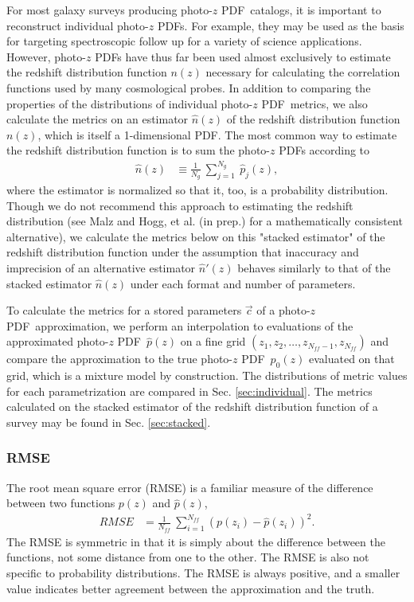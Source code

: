 \documentclass[\docopts]{\docclass}
\newcommand{\pz}{photo-$z$ PDF}
\begin{document}
For most galaxy surveys producing \pz\ catalogs, it is important to reconstruct 
individual \pz s.  For example, they may be used as the basis for targeting 
spectroscopic follow up for a variety of science applications.  However, \pz s 
have thus far been used almost exclusively to estimate the redshift 
distribution function $n(z)$ necessary for calculating the correlation 
functions used by many cosmological probes.  In addition to comparing the 
properties of the distributions of individual \pz\ metrics, we also calculate 
the metrics on an estimator $\hat{n}(z)$ of the redshift distribution function 
$n(z)$, which is itself a 1-dimensional PDF.  The most common way to estimate 
the redshift distribution function is to sum the \pz s according to
\begin{align}
  \label{eq:nz}
  \hat{n}(z) &\equiv \frac{1}{N_{g}}\ \sum_{j=1}^{N_{g}}\ \hat{p}_{j}(z),
\end{align}
where the estimator is normalized so that it, too, is a probability 
distribution.  Though we do not recommend this approach to estimating the 
redshift distribution (see Malz and Hogg, et al. (in prep.) for a 
mathematically consistent alternative), we calculate the metrics below on this 
"stacked estimator" of the redshift distribution function under the assumption 
that inaccuracy and imprecision of an alternative estimator $\hat{n}'(z)$ 
behaves similarly to that of the stacked estimator $\hat{n}(z)$ under each 
format and number of parameters.

To calculate the metrics for a stored parameters $\vec{c}$ of a \pz\ 
approximation, we perform an interpolation to evaluations of the approximated 
\pz\ $\hat{p}(z)$ on a fine grid $(z_{1}, z_{2}, \dots, z_{N_{ff}-1}, 
z_{N_{ff}})$ and compare the approximation to the true \pz\ $p_{0}(z)$ 
evaluated on that grid, which is a mixture model by construction.  The 
distributions of metric values for each parametrization are compared in Sec. 
\ref{sec:individual}.  The metrics calculated on the stacked estimator of the 
redshift distribution function of a survey may be found in Sec. 
\ref{sec:stacked}.

\subsubsection{RMSE}
\label{sec:rms}


The root mean square error (RMSE) is a familiar measure of the difference 
between two functions $p(z)$ and $\hat{p}(z)$,
\begin{align}
  \label{eq:rmse}
  RMSE &= \frac{1}{N_{ff}}\ \sum_{i=1}^{N_{ff}} (p(z_{i}) - \hat{p}(z_{i}))^{2}.
\end{align}
The RMSE is symmetric in that it is simply about the difference between the 
functions, not some distance from one to the other.  The RMSE is also not 
specific to probability distributions.  The RMSE is always positive, and a 
smaller value indicates better agreement between the approximation and the 
truth.
\end{document}
